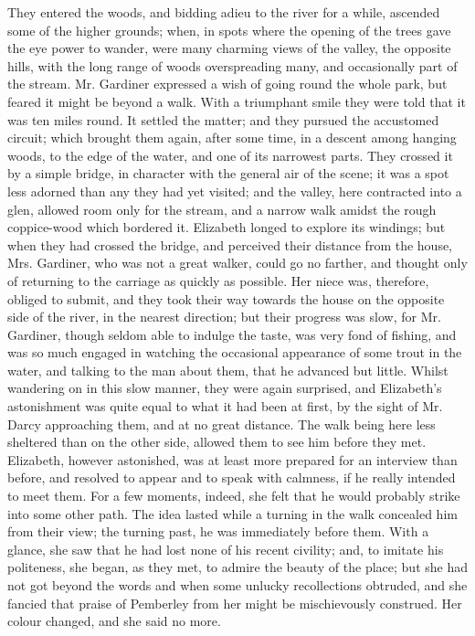 They entered the woods, and bidding adieu to the river for a while, ascended some of the higher grounds; when, in spots where the opening of the trees gave the eye power to wander, were many charming views of the valley, the opposite hills, with the long range of woods overspreading many, and occasionally part of the stream. Mr. Gardiner expressed a wish of going round the whole park, but feared it might be beyond a walk. With a triumphant smile they were told that it was ten miles round. It settled the matter; and they pursued the accustomed circuit; which brought them again, after some time, in a descent among hanging woods, to the edge of the water, and one of its narrowest parts. They crossed it by a simple bridge, in character with the general air of the scene; it was a spot less adorned than any they had yet visited; and the valley, here contracted into a glen, allowed room only for the stream, and a narrow walk amidst the rough coppice-wood which bordered it. Elizabeth longed to explore its windings; but when they had crossed the bridge, and perceived their distance from the house, Mrs. Gardiner, who was not a great walker, could go no farther, and thought only of returning to the carriage as quickly as possible. Her niece was, therefore, obliged to submit, and they took their way towards the house on the opposite side of the river, in the nearest direction; but their progress was slow, for Mr. Gardiner, though seldom able to indulge the taste, was very fond of fishing, and was so much engaged in watching the occasional appearance of some trout in the water, and talking to the man about them, that he advanced but little. Whilst wandering on in this slow manner, they were again surprised, and Elizabeth's astonishment was quite equal to what it had been at first, by the sight of Mr. Darcy approaching them, and at no great distance. The walk being here less sheltered than on the other side, allowed them to see him before they met. Elizabeth, however astonished, was at least more prepared for an interview than before, and resolved to appear and to speak with calmness, if he really intended to meet them. For a few moments, indeed, she felt that he would probably strike into some other path. The idea lasted while a turning in the walk concealed him from their view; the turning past, he was immediately before them. With a glance, she saw that he had lost none of his recent civility; and, to imitate his politeness, she began, as they met, to admire the beauty of the place; but she had not got beyond the words  and  when some unlucky recollections obtruded, and she fancied that praise of Pemberley from her might be mischievously construed. Her colour changed, and she said no more.

